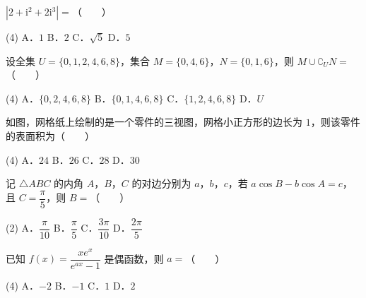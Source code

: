 

\par\medskip


\begin{question}
$|2+\mathrm i^2+2\mathrm i^3|=$\mbox{（　　）}

\begin{gkopts}(4)
\task A．$1$
\task B．$2$
\task C．$\sqrt5$
\task D．$5$
\end{gkopts}

\end{question}
\begin{question}
设全集 $U=\{0,1,2,4,6,8\}$，集合 $M=\{0,4,6\}$，$N=\{0,1,6\}$，则 $M\cup\complement_U N=$\mbox{（　　）}

\begin{gkopts}(4)
\task A．$\{0,2,4,6,8\}$
\task B．$\{0,1,4,6,8\}$
\task C．$\{1,2,4,6,8\}$
\task D．$U$
\end{gkopts}

\Needspace{0.4\textheight}
\end{question}
\begin{question}
如图，网格纸上绘制的是一个零件的三视图，网格小正方形的边长为 $1$，则该零件的表面积为\mbox{（　　）}
\nopagebreak[4]
\begin{center}\end{center}
\nopagebreak[4]
\begin{gkopts}(4)
\task A．$24$
\task B．$26$
\task C．$28$
\task D．$30$
\end{gkopts}

\end{question}
\begin{question}
记 $\triangle ABC$ 的内角 $A$，$B$，$C$ 的对边分别为 $a$，$b$，$c$，若 $a\cos B-b\cos A=c$，且 $C=\dfrac\pi5$，则 $B=$\mbox{（　　）}

\begin{gkopts}(2)
\task A．$\dfrac\pi{10}$
\task B．$\dfrac\pi5$
\task C．$\dfrac{3\pi}{10}$
\task D．$\dfrac{2\pi}5$
\end{gkopts}

\end{question}
\begin{question}
已知 $f(x)=\dfrac{xe^x}{e^{ax}-1}$ 是偶函数，则 $a=$\mbox{（　　）}

\begin{gkopts}(4)
\task A．$-2$
\task B．$-1$
\task C．$1$
\task D．$2$
\end{gkopts}

\end{question}

